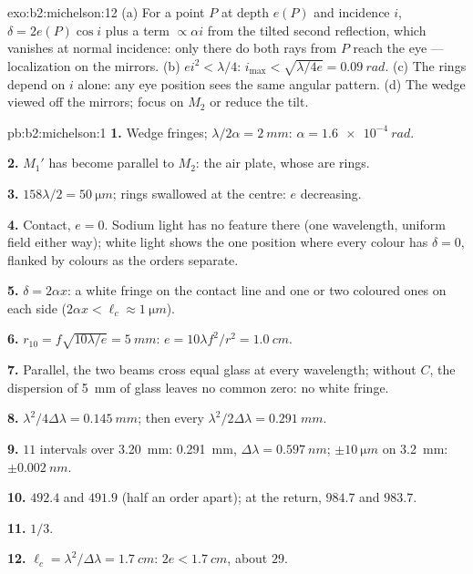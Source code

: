 \begin{solution}{exo:b2:michelson:12}
(a) For a point $P$ at depth $e(P)$ and incidence $i$, $\delta = 2e(P)\cos i$
plus a term $\propto\alpha i$ from the tilted second reflection, which
vanishes at normal incidence: only there do both rays from $P$ reach
the eye --- localization on the mirrors. (b) $ei^2 < \lambda/4$: $i_{\max} <
\sqrt{\lambda/4e} = \qty{0.09}{rad}$. (c) The rings depend on $i$ alone: any eye
position sees the same angular pattern. (d) The wedge viewed off the
mirrors; focus on $M_2$ or reduce the tilt.
\end{solution}

\begin{solution}{pb:b2:michelson:1}
\textbf{1.} Wedge fringes; $\lambda/2\alpha = \qty{2}{mm}$: $\alpha = \qty{1.6e-4}{rad}$.

\textbf{2.} $M_1'$ has become parallel to $M_2$: the air plate, whose
 are rings.

\textbf{3.} $158\lambda/2 = \qty{50}{\micro m}$; rings swallowed at the centre: $e$
decreasing.

\textbf{4.} Contact, $e = 0$. Sodium light has no feature there (one
wavelength, uniform field either way); white light shows the one
position where every colour has $\delta = 0$, flanked by colours as the
orders separate.

\textbf{5.} $\delta = 2\alpha x$: a white fringe on the contact line and one or
two coloured ones on each side ($2\alpha x < \ell_c \approx \qty{1}{\micro m}$).

\textbf{6.} $r_{10} = f\sqrt{10\lambda/e} = \qty{5}{mm}$: $e = 10\lambda f^2/r^2 = \qty{1.0}{cm}$.

\textbf{7.} Parallel, the two beams cross equal glass at every
wavelength; without $C$, the dispersion of \qty{5}{mm} of glass leaves no
common zero: no white fringe.

\textbf{8.} $\lambda^2/4\Delta\lambda = \qty{0.145}{mm}$; then every $\lambda^2/2\Delta\lambda = \qty{0.291}{mm}$.

\textbf{9.} $11$ intervals over \qty{3.20}{mm}: \qty{0.291}{mm}, $\Delta\lambda = \qty{0.597}{nm}$;
$\pm\qty{10}{\micro m}$ on \qty{3.2}{mm}: $\pm\qty{0.002}{nm}$.

\textbf{10.} $492.4$ and $491.9$ (half an order apart); at the return,
$984.7$ and $983.7$.

\textbf{11.} $1/3$.

\textbf{12.} $\ell_c = \lambda^2/\Delta\lambda = \qty{1.7}{cm}$: $2e < \qty{1.7}{cm}$, about $29$.


\end{solution}
